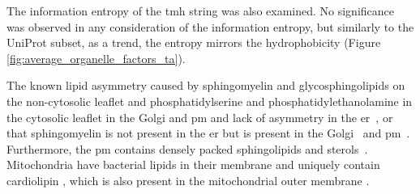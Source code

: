The information entropy of the \gls{tmh} string was also examined.
No significance was observed in any consideration of the information entropy, but similarly to the UniProt subset, as a trend, the entropy mirrors the hydrophobicity (Figure \ref{fig:average_organelle_factors_ta}).

The known lipid asymmetry caused by sphingomyelin and glycosphingolipids on the non-cytosolic leaflet and phosphatidylserine and phosphatidylethanolamine in the cytosolic leaflet in the Golgi and \gls{pm} and lack of asymmetry in the \gls{er}~\cite{Daleke2007, Devaux2004}, or that sphingomyelin is not present in the \gls{er} but is present in the Golgi~\cite{Futerman2005} and \gls{pm}~\cite{Li2007, Tafesse2007}.
Furthermore, the \gls{pm} contains densely packed sphingolipids and sterols~\cite{Paolo2006}.
Mitochondria have bacterial lipids in their membrane and uniquely contain cardiolipin \cite{Choi2005}, which is also present in the mitochondrial outer membrane \cite{Gebert2009}.

